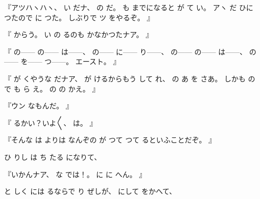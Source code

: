 『アツハヽハヽ、
%
い
だナ、
%
の
だ。
%
も
までになると
が
て
い。
%
アヽ
だ
ひに
つたので
に
つた。
%
しぶりで
ツ
をやるぞ。
』

『
からう。
%
い
の
るのも
かなかつたナア。
』

『
の{---}{---}
の{---}{---}
は{---}{---}、
%
の{---}{---}
に{---}{---}
り{---}{---}、
%
の{---}{---}
の{---}{---}
は{---}{---}、
%
の{---}{---}
を{---}{---}
つ{---}{---}。
%
エースト。
』

『
が
くやうな
だナア、
%
が
けるからもう
して%
れ、
%
の
あ
を
さあ。
%
しかも
の
で
も
ら
え。
%
の
の
かえ。
』

『ウン
なもんだ。
』

『
るかい？いよ〳〵、
%
は。
』

『そんな
は
よりは
なんぞの%
が
つて
つて
るといふことだぞ。
』

ひ
りし
は
ち
たる
になりて、

『いかんナア、
%
な
では！。
%
に
に
へん。
』

と
しく
には
るならで
り
ぜしが、
%
にして
をかへて、


